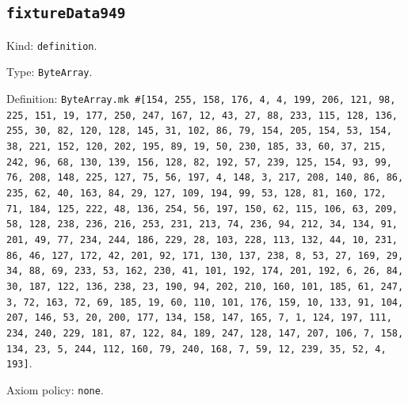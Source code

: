 \documentclass[11pt]{article}
\begin{document}
\subsection*{\texttt{fixtureData949}}
\noindent Kind: \texttt{definition}.\par
\noindent Type: \texttt{ByteArray}.\par
\noindent Definition: \texttt{ByteArray.mk \#[154, 255, 158, 176, 4, 4, 199, 206, 121, 98, 225, 151, 19, 177, 250, 247, 167, 12, 43, 27, 88, 233, 115, 128, 136, 255, 30, 82, 120, 128, 145, 31, 102, 86, 79, 154, 205, 154, 53, 154, 38, 221, 152, 120, 202, 195, 89, 19, 50, 230, 185, 33, 60, 37, 215, 242, 96, 68, 130, 139, 156, 128, 82, 192, 57, 239, 125, 154, 93, 99, 76, 208, 148, 225, 127, 75, 56, 197, 4, 148, 3, 217, 208, 140, 86, 86, 235, 62, 40, 163, 84, 29, 127, 109, 194, 99, 53, 128, 81, 160, 172, 71, 184, 125, 222, 48, 136, 254, 56, 197, 150, 62, 115, 106, 63, 209, 58, 128, 238, 236, 216, 253, 231, 213, 74, 236, 94, 212, 34, 134, 91, 201, 49, 77, 234, 244, 186, 229, 28, 103, 228, 113, 132, 44, 10, 231, 86, 46, 127, 172, 42, 201, 92, 171, 130, 137, 238, 8, 53, 27, 169, 29, 34, 88, 69, 233, 53, 162, 230, 41, 101, 192, 174, 201, 192, 6, 26, 84, 30, 187, 122, 136, 238, 23, 190, 94, 202, 210, 160, 101, 185, 61, 247, 3, 72, 163, 72, 69, 185, 19, 60, 110, 101, 176, 159, 10, 133, 91, 104, 207, 146, 53, 20, 200, 177, 134, 158, 147, 165, 7, 1, 124, 197, 111, 234, 240, 229, 181, 87, 122, 84, 189, 247, 128, 147, 207, 106, 7, 158, 134, 23, 5, 244, 112, 160, 79, 240, 168, 7, 59, 12, 239, 35, 52, 4, 193]}.\par
\noindent Axiom policy: \texttt{none}.\par
\end{document}
